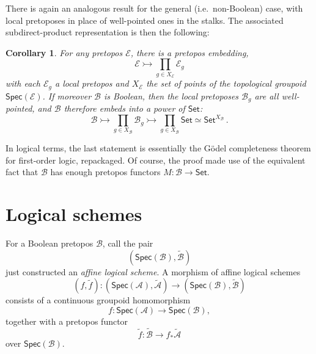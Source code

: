 \documentclass[12pt]{article}
\newcommand{\B}{\ensuremath{\mathcal{B}}}
\newcommand{\E}{\ensuremath{\mathcal{E}}}
\newcommand{\Set}{\ensuremath{\mathsf{Set}}}
\newtheorem*{corollary*}{Corollary}
\theoremstyle{remark}
\theoremstyle{definition}
\begin{document}
There is again an analogous result for the general (i.e.\ non-Boolean) case, with local pretoposes in place of well-pointed ones in the stalks.  The associated subdirect-product representation is then the following:

\begin{corollary*}\label{bptsdp}
For any pretopos $\E$, there is a pretopos embedding,
\[
\mathcal{E}\rightarrowtail \prod_{g\in X_\E}\mathcal{E}_{g} 
\]
with each $\E_g$ a local pretopos and $X_\E$ the set of points of the topological groupoid $\mathsf{Spec}(\mathcal{E})$.
If moreover $\B$ is Boolean, then the local pretoposes $\mathcal{B}_{g}$ are all well-pointed, and  $\B$ therefore embeds into a power of $\Set$: 
\[
\mathcal{B}\rightarrowtail \prod_{g\in X_\B}\mathcal{B}_{g} 
\rightarrowtail \prod_{g\in X_\B}\Set \simeq \Set^{X_\B}\,.
\]


\end{corollary*}
In logical terms, the last statement is essentially the G\"odel completeness theorem for first-order logic, repackaged.  Of course, the proof made use of the equivalent fact that $\B$ has enough pretopos functors $M:\B\to\Set$. 

%
%

\section{Logical schemes}

For a Boolean pretopos $\B$, call the pair $$(\mathsf{Spec}(\mathcal{B}), \widetilde{\mathcal{B}})$$ just constructed an \emph{affine logical scheme}.
A morphism of affine logical schemes
\[
(f, \widetilde{f}) : (\mathsf{Spec}(\mathcal{A}), \widetilde{\mathcal{A}}) \to (\mathsf{Spec}(\mathcal{B}), \widetilde{\mathcal{B}})
\]
consists of a continuous groupoid homomorphism 
\[
f : \mathsf{Spec}(\mathcal{A}) \to \mathsf{Spec}(\mathcal{B}),
\]
together with a pretopos functor 
\[
\widetilde{f} : \widetilde{\mathcal{B}} \to f_*\widetilde{\mathcal{A}}
\]
over $\mathsf{Spec}(\mathcal{B})$.
\end{document}

